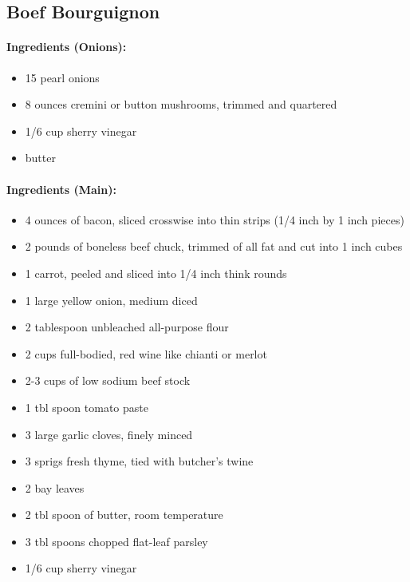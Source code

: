 \documentclass{article}
\begin{document}
\subsection{Boef Bourguignon} 

\paragraph{Ingredients (Onions):}
\begin{itemize}
    \item 15 pearl onions
    \item 8 ounces cremini or button mushrooms, trimmed and quartered
    \item 1/6 cup sherry vinegar
    \item butter
\end{itemize}  

\paragraph{Ingredients (Main):}
\begin{itemize}
    \item 4 ounces of bacon, sliced crosswise into thin strips (1/4 inch by 1 inch pieces)
    \item 2 pounds of boneless beef chuck, trimmed of all fat and cut into 1 inch cubes
    \item 1 carrot, peeled and sliced into 1/4 inch think rounds
    \item 1 large yellow onion, medium diced
    \item 2 tablespoon unbleached all-purpose flour
    \item 2 cups full-bodied, red wine like chianti or merlot
    \item 2-3 cups of low sodium beef stock
    \item 1 tbl spoon tomato paste
    \item 3 large garlic cloves, finely minced
    \item 3 sprigs fresh thyme, tied with butcher's twine
    \item 2 bay leaves
    \item 2 tbl spoon of butter, room temperature
    \item 3 tbl spoons chopped flat-leaf parsley
    \item 1/6 cup sherry vinegar
\end{itemize}  
\end{document}
